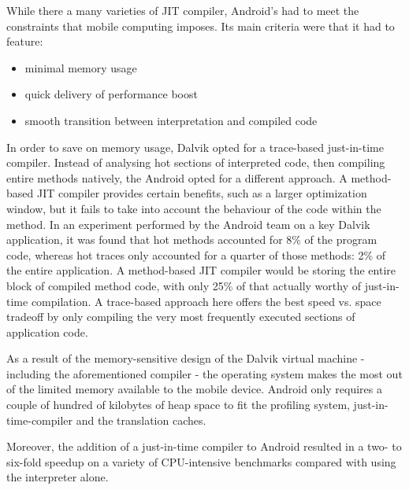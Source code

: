 While there a many varieties of JIT compiler, Android's had to meet the constraints that mobile computing imposes. Its main criteria were that it had to feature:

\begin{itemize}
    \item minimal memory usage
    \item quick delivery of performance boost
    \item smooth transition between interpretation and compiled code
\end{itemize}

In order to save on memory usage, Dalvik opted for a trace-based just-in-time compiler. Instead of analysing hot sections of interpreted code, then compiling entire methods natively, the Android opted for a different approach. A method-based JIT compiler provides certain benefits, such as a larger optimization window, but it fails to take into account the behaviour of the code within the method. In an experiment performed by the Android team on a key Dalvik application, it was found that hot methods accounted for 8\% of the program code, whereas hot traces only accounted for a quarter of those methods: 2\% of the entire application\cite{android_22}. A method-based JIT compiler would be storing the entire block of compiled method code, with only 25\% of that actually worthy of just-in-time compilation. A trace-based approach here offers the best speed vs. space tradeoff by only compiling the very most frequently executed sections of application code.

As a result of the memory-sensitive design of the Dalvik virtual machine - including the aforementioned compiler - the operating system makes the most out of the limited memory available to the mobile device. Android only requires a couple of hundred of kilobytes of heap space to fit the profiling system, just-in-time-compiler and the translation caches\cite{android_22}.

Moreover, the addition of a just-in-time compiler to Android resulted in a two- to six-fold speedup on a variety of CPU-intensive benchmarks compared with using the interpreter alone\cite{android_22}.
